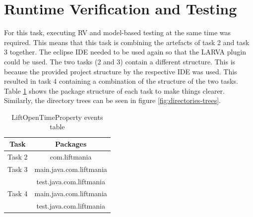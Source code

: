 \documentclass[a4paper, 12pt]{article}
\begin{document}
\section{Runtime Verification and Testing}
For this task, executing RV and model-based testing at the same time was required. This means that this task is combining the artefacts of task 2 and task 3 together.  The eclipse IDE needed to be used again so that the LARVA plugin could be used. The two tasks (2 and 3) contain a different structure. This is because the provided project structure by the respective IDE was used. This resulted in task 4 containing a combination of the structure of the two tasks. Table \ref{tab:packages-structure} shows the package structure of each task to make things clearer. Similarly, the directory trees can be seen in figure \ref{fig:directories-trees}. \\

\begin{table}[h]
   \centering
   \begin{tabular}{@{}  |c|c| @{}} %
      \toprule
      Task   & Packages \\
      \midrule
      Task 2  &  com.liftmania\\
      Task 3 & main.java.com.liftmania  \\
      & test.java.com.liftmania\\
      Task 4  & main.java.com.liftmania\\
      & test.java.com.liftmania\\
      \bottomrule
   \end{tabular}
   \caption{LiftOpenTimeProperty events table}
   \label{tab:packages-structure}
\end{table}
\end{document}
